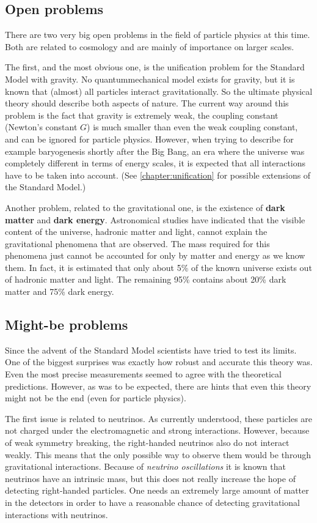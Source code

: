 \subsection{Open problems}

    There are two very big open problems in the field of particle physics at this time. Both are related to cosmology and are mainly of importance on larger scales.

    The first, and the most obvious one, is the unification problem for the Standard Model with gravity. No quantummechanical model exists for gravity, but it is known that (almost) all particles interact gravitationally. So the ultimate physical theory should describe both aspects of nature. The current way around this problem is the fact that gravity is extremely weak, the coupling constant (Newton's constant $G$) is much smaller than even the weak coupling constant, and can be ignored for particle physics. However, when trying to describe for example baryogenesis shortly after the Big Bang, an era where the universe was completely different in terms of energy scales, it is expected that all interactions have to be taken into account. (See \cref{chapter:unification} for possible extensions of the Standard Model.)

    Another problem, related to the gravitational one, is the existence of \textbf{dark matter} and \textbf{dark energy}. Astronomical studies have indicated that the visible content of the universe, hadronic matter and light, cannot explain the gravitational phenomena that are observed. The mass required for this phenomena just cannot be accounted for only by matter and energy as we know them. In fact, it is estimated that only about 5\% of the known universe exists out of hadronic matter and light. The remaining 95\% contains about 20\% dark matter and 75\% dark energy.

\subsection{Might-be problems}

    Since the advent of the Standard Model scientists have tried to test its limits. One of the biggest surprises was exactly how robust and accurate this theory was. Even the most precise measurements seemed to agree with the theoretical predictions. However, as was to be expected, there are hints that even this theory might not be the end (even for particle physics).

    The first issue is related to neutrinos. As currently understood, these particles are not charged under the electromagnetic and strong interactions. However, because of weak symmetry breaking, the right-handed neutrinos also do not interact weakly. This means that the only possible way to observe them would be through gravitational interactions. Because of \textit{neutrino oscillations} it is known that neutrinos have an intrinsic mass, but this does not really increase the hope of detecting right-handed particles. One needs an extremely large amount of matter in the detectors in order to have a reasonable chance of detecting gravitational interactions with neutrinos.


